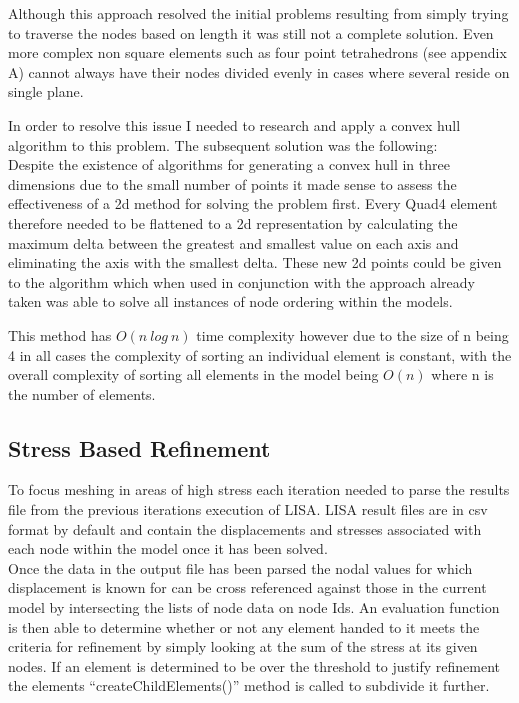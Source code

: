 Although this approach resolved the initial problems resulting from simply trying to traverse the nodes based on length it was still not a complete solution. Even more complex non square elements such as four point tetrahedrons (see appendix A) cannot always have their nodes divided evenly in cases where several reside on  single plane. 




 
\noindent
In order to resolve this issue I needed to research and apply a convex hull algorithm to this problem. The subsequent solution was the following: \\ 




\noindent
Despite the existence of algorithms for generating a convex hull in three dimensions due to the small number of points it made sense to assess the effectiveness of a 2d method for solving the problem first. Every Quad4 element therefore needed to be flattened to a 2d representation by calculating the maximum delta between the greatest and smallest value on each axis and eliminating the axis with the smallest delta. These new 2d points could be given to the algorithm which when used in conjunction with the approach already taken was able to solve all instances of node ordering within the models.



\noindent
This method has $O(n\ log\ n)$ time complexity however due to the size of n being 4 in all cases the complexity of sorting an individual element is constant, with the overall complexity of sorting all elements in the model being $O(n)$ where n is the number of elements.


\subsection{Stress Based Refinement}
To focus meshing in areas of high stress each iteration needed to parse the results file from the previous iterations execution of LISA. LISA result files are in csv format by default and contain the displacements and stresses associated with each node within the model once it has been solved. \\

\noindent
Once the data in the output file has been parsed the nodal values for which displacement is known for can be cross referenced against those in the current model by intersecting the lists of node data on node Ids. An evaluation function is then able to determine whether or not any element handed to it meets the criteria for refinement by simply looking at the sum of the stress at its given nodes. If an element is determined to be over the threshold to justify refinement the elements ``createChildElements()'' method is called to subdivide it further. \\


